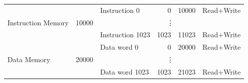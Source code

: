 \documentclass{article}
\begin{document}
\begin{table}[]
\begin{tabular}{|l|r|l|r|r|l|}
\multirow{3}{*}{Instruction Memory} & \multirow{3}{*}{10000} & Instruction 0        & 0                     & 10000               & Read+Write          \\ \cline{3-6} 
                                    &                        & \multicolumn{4}{c|}{\vdots}                                                              \\ \cline{3-6} 
                                    &                        & Instruction 1023     & 1023                  & 11023               & Read+Write          \\ \hline
\multirow{3}{*}{Data Memory}        & \multirow{3}{*}{20000} & Data word 0          & 0                     & 20000               & Read+Write          \\ \cline{3-6} 
                                    &                        & \multicolumn{4}{c|}{\vdots}                                                              \\ \cline{3-6} 
                                    &                        & Data word 1023       & 1023                  & 21023               & Read+Write          \\ \hline
\end{tabular}
\end{table}
\end{document}
